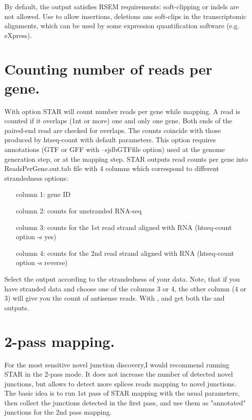\documentclass[12pt]{article}
\begin{document}
By default, the output satisfies RSEM requirements: soft-clipping or indels are not allowed. Use   to allow insertions, deletions ans soft-clips in the transcriptomic alignments, which can be used by some expression quantification software (e.g. eXpress). 

\section{Counting number of reads per gene.}
With   option STAR will count number reads per gene while mapping. 
A read is counted if it overlaps (1nt or more) one and only one gene. Both ends of the paired-end read are checked for overlaps. 
The counts coincide with those produced by htseq-count with default parameters.
This option requires annotations (GTF or GFF with --sjdbGTFfile option) used at the genome generation step, or at the mapping step.
STAR outputs read counts per gene into ReadsPerGene.out.tab file with 4 columns which correspond to different strandedness options:
\begin{itemize}[leftmargin=1in]
\item[column 1:] gene ID
\item[column 2:] counts for unstranded RNA-seq
\item[column 3:] counts for the 1st read strand aligned with RNA (htseq-count option -s yes)
\item[column 4:] counts for the 2nd read strand aligned with RNA (htseq-count option -s reverse)
\end{itemize}
Select the output according to the strandedness of your data.
Note, that if you have stranded data and choose one of the columns 3 or 4, the other column (4 or 3) will give you the count of antisense reads.
With   , and get both the  and  outputs.


\section{2-pass mapping.}

For the most sensitive novel junction discovery,I would recommend running STAR in the 2-pass mode. It does not increase the number of detected novel junctions, but allows to detect more splices reads mapping to novel junctions. The basic idea is to run 1st pass of STAR mapping with the usual parameters, then collect the junctions detected in the first pass, and use them as "annotated" junctions for the 2nd pass mapping.
\end{document}
